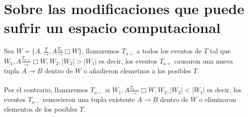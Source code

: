 \documentclass[12pt]{book}
\begin{document}
\section{Sobre las modificaciones que puede sufrir un espacio computacional}

Sea \(W = \{A, \frac{T}{\rightarrow}, A \frac{T_a}{\rightarrow} \Box W \}\), llamaremos $T_{a+}$ a todos los eventos de $T$ tal que $W_1, A\frac{T_{a+}}{\rightarrow}\Box W, W_2, |W_2| > |W_1|$ es decir, los eventos $T_{a+}$ causaron una nueva tupla $A \rightarrow B$ dentro de $W$ 
o añadieron elemetnos a los posibles $T$.
\\\\
Por el contrario, llamaremos $T_{a-}$ si $W_1, A\frac{T_{a-}}{\rightarrow}\Box W, W_2, |W_2| < |W_1|$ es decir, los eventos $T_{a-}$ removieron una tupla existente $A \rightarrow B$ dentro de $W$ o eliminaron elementos de los posibles $T$.
\end{document}
